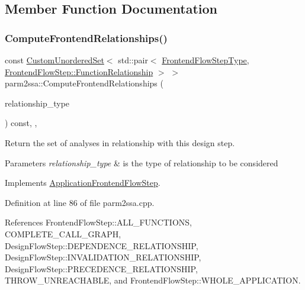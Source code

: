 \subsection{Member Function Documentation}
\mbox{\label{classparm2ssa_aeb5979e5ccbcd6e55fea2eb82aaddec5}} 
\subsubsection{\texorpdfstring{Compute\+Frontend\+Relationships()}{ComputeFrontendRelationships()}}
{\footnotesize\ttfamily const \hyperlink{classCustomUnorderedSet}{Custom\+Unordered\+Set}$<$ std\+::pair$<$ \hyperlink{frontend__flow__step_8hpp_afeb3716c693d2b2e4ed3e6d04c3b63bb}{Frontend\+Flow\+Step\+Type}, \hyperlink{classFrontendFlowStep_af7cf30f2023e5b99e637dc2058289ab0}{Frontend\+Flow\+Step\+::\+Function\+Relationship} $>$ $>$ parm2ssa\+::\+Compute\+Frontend\+Relationships (\begin{DoxyParamCaption}\item[{const \hyperlink{classDesignFlowStep_a723a3baf19ff2ceb77bc13e099d0b1b7}{Design\+Flow\+Step\+::\+Relationship\+Type}}]{relationship\+\_\+type }\end{DoxyParamCaption}) const\hspace{0.3cm}{\ttfamily [override]}, {\ttfamily [protected]}, {\ttfamily [virtual]}}



Return the set of analyses in relationship with this design step. 


\begin{DoxyParams}{Parameters}
{\em relationship\+\_\+type} & is the type of relationship to be considered \\
\hline
\end{DoxyParams}


Implements \hyperlink{classApplicationFrontendFlowStep_ab308200c0096ccff3a1ff50e864ed61f}{Application\+Frontend\+Flow\+Step}.



Definition at line 86 of file parm2ssa.\+cpp.



References Frontend\+Flow\+Step\+::\+A\+L\+L\+\_\+\+F\+U\+N\+C\+T\+I\+O\+NS, C\+O\+M\+P\+L\+E\+T\+E\+\_\+\+C\+A\+L\+L\+\_\+\+G\+R\+A\+PH, Design\+Flow\+Step\+::\+D\+E\+P\+E\+N\+D\+E\+N\+C\+E\+\_\+\+R\+E\+L\+A\+T\+I\+O\+N\+S\+H\+IP, Design\+Flow\+Step\+::\+I\+N\+V\+A\+L\+I\+D\+A\+T\+I\+O\+N\+\_\+\+R\+E\+L\+A\+T\+I\+O\+N\+S\+H\+IP, Design\+Flow\+Step\+::\+P\+R\+E\+C\+E\+D\+E\+N\+C\+E\+\_\+\+R\+E\+L\+A\+T\+I\+O\+N\+S\+H\+IP, T\+H\+R\+O\+W\+\_\+\+U\+N\+R\+E\+A\+C\+H\+A\+B\+LE, and Frontend\+Flow\+Step\+::\+W\+H\+O\+L\+E\+\_\+\+A\+P\+P\+L\+I\+C\+A\+T\+I\+ON.

